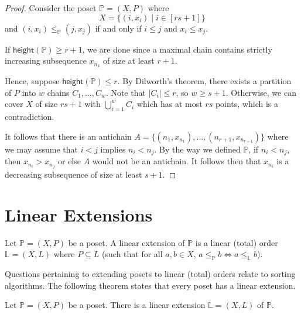 \begin{proof}
    Consider the poset $\mathbb{P} = (X,P)$ where
    $$
    X = \{ (i,x_i) \mid i \in [rs + 1]\}
    $$
    and $(i,x_i) \leq_{\mathbb{P}} (j,x_j)$ if and only if $i \leq j$ and $x_i \leq x_j$.

    If $\mathsf{height}(\mathbb{P}) \geq r+1$, we are done since a maximal chain contains strictly increasing subsequence $x_{n_k}$ of size at least $r+1$. 
    
    Hence, suppose $\mathsf{height}(\mathbb{P}) \leq r$. By Dilworth's theorem, there exists a partition of $P$ into $w$ chains $C_1,\ldots,C_w$. Note that $|C_i| \leq r$, so $w \geq s + 1$. Otherwise, we can cover $X$ of size $rs + 1$ with $\bigcup_{i=1}^w C_i$ which has at most $rs$ points, which is a contradiction.

    It follows that there is an antichain $A = \{(n_1,x_{n_1}),\ldots,(n_{r+1}, x_{n_{r+1}})\}$ where we may assume that $i < j$ implies $n_i < n_j$. By the way we defined $\mathbb{P}$, if $n_i < n_j$, then $x_{n_i} > x_{n_j}$ or else $A$ would not be an antichain. It follows then that $x_{n_i}$ is a decreasing subsequence of size at least $s+1$.
\end{proof}

\section{Linear Extensions}

\begin{definition}
    Let $\mathbb{P} = (X,P)$ be a poset. A linear extension of $\mathbb{P}$ is a linear (total) order $\mathbb{L} = (X,L)$ where $P \subseteq L$ (such that for all $a,b \in X$, $a \leq_{\mathbb{P}} b \iff a \leq_{\mathbb{L}} b$).
\end{definition}

Questions pertaining to extending posets to linear (total) orders relate to sorting algorithms. The following theorem states that every poset has a linear extension.

\begin{theorem}
    Let $\mathbb{P} = (X,P)$ be a poset. There is a linear extension $\mathbb{L} = (X,L)$ of $\mathbb{P}$.
\end{theorem}

